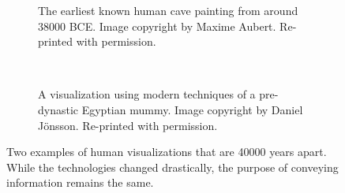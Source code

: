 \begin{figure}
  \centering
  \begin{subfigure}{0.4\textwidth}
    \caption{The earliest known human cave painting from around 38000 BCE. Image copyright by Maxime Aubert. Re-printed with permission.}
    \label{fig:motivation:vis:cave}
  \end{subfigure}
  ~
  \begin{subfigure}{0.4\textwidth}
    \caption{A visualization using modern techniques of a pre-dynastic Egyptian mummy. Image copyright by Daniel J\"onsson. Re-printed with permission.}
    \label{fig:motivation:vis:modern}
  \end{subfigure}
  \caption{Two examples of human visualizations that are 40000 years apart. While the technologies changed drastically, the purpose of conveying information remains the same.}
  \label{fig:motivation:vis}
\end{figure}

